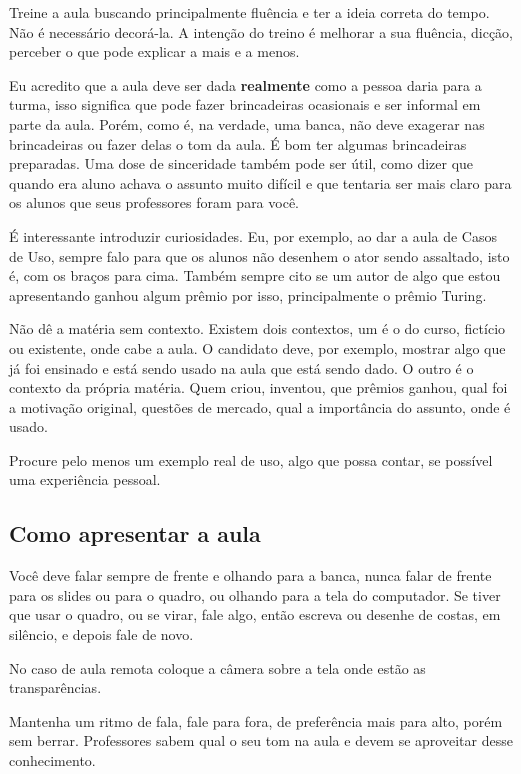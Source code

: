 \documentclass{article}
\begin{document}
Treine a aula buscando principalmente fluência e ter a ideia correta do tempo. Não é necessário decorá-la. A intenção do treino é melhorar a sua fluência, dicção, perceber o que pode explicar a mais e a menos.

Eu acredito que a aula deve ser dada \textbf{realmente} como a pessoa daria para a turma, isso significa que pode fazer brincadeiras ocasionais e ser informal em parte da aula. Porém, como é, na verdade, uma banca, não deve exagerar nas brincadeiras ou fazer delas o tom da aula. É bom ter algumas brincadeiras preparadas. Uma dose de sinceridade também pode ser útil, como dizer que quando era aluno achava o assunto muito difícil e que tentaria ser mais claro para os alunos que seus professores foram para você.

É interessante introduzir curiosidades. Eu, por exemplo, ao dar a aula de Casos de Uso, sempre falo para que os alunos não desenhem o ator sendo assaltado, isto é, com os braços para cima. Também sempre cito se um autor de algo que estou apresentando ganhou algum prêmio por isso, principalmente o prêmio Turing.

Não dê a matéria sem contexto. Existem dois contextos, um é o do curso, fictício ou existente, onde cabe a aula. O candidato deve, por exemplo, mostrar algo que já foi ensinado e está sendo usado na aula que está sendo dado. O outro é o contexto da própria matéria. Quem criou, inventou, que prêmios ganhou, qual foi a motivação original, questões de mercado, qual a importância do assunto, onde é usado.

Procure pelo menos um exemplo real de uso, algo que possa contar, se possível uma experiência pessoal.

\subsection{Como apresentar a aula}

Você deve falar sempre de frente e olhando para a banca, nunca falar de frente para os slides ou para o quadro, ou olhando para a tela do computador. Se tiver que usar o quadro, ou se virar, fale algo, então escreva ou desenhe de costas, em silêncio, e depois fale de novo. 

No caso de aula remota coloque a câmera sobre a tela onde estão as transparências.

Mantenha um ritmo de fala, fale para fora, de preferência mais para alto, porém sem berrar. Professores sabem qual o seu tom na aula e devem se aproveitar desse conhecimento.
\end{document}
